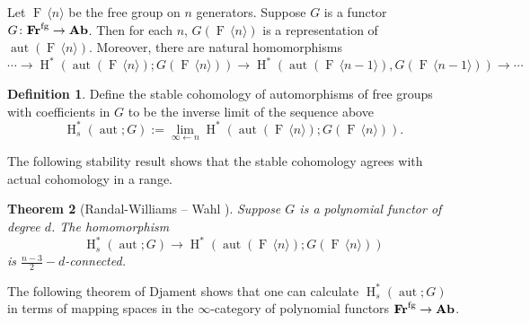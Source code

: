 \documentclass[psamsfonts]{amsart}
\theoremstyle{plain}
\newtheorem{thm}{Theorem}[section]
\theoremstyle{definition}
\newtheorem{defn}[thm]{Definition}
\theoremstyle{remark}
\newcommand{\catname}[1]{{\normalfont\textbf{#1}}}
\newcommand{\fr}{\allfr^{\mathrm{fg}}}
\newcommand{\allfr}{\catname{Fr}}
\newcommand{\ab}{\catname{Ab}}
\newcommand{\aut}{\operatorname{aut}}
\newcommand{\free}[1]{\operatorname{F}\,\langle #1\rangle}
\newcommand{\HH}{\operatorname{H}} %
\begin{document}
Let $\free{n}$ be the free group on $n$ generators. Suppose $G$ is a functor $G\colon \fr\to \ab$. Then for each $n$, $G(\free{n})$ is a representation of $\aut(\free{n})$. Moreover, there are natural homomorphisms
\[
 \cdots \to \HH^*(\aut(\free{n}); G(\free{n}))\to \HH^*(\aut(\free{n-1}), G(\free{n-1}))\to \cdots
\] 
\begin{defn}
Define the stable cohomology of automorphisms of free groups with coefficients in $G$ to be the inverse limit of the sequence above
\[\HH^*_s(\aut; G):=\lim_{\infty \leftarrow n}\HH^*(\aut(\free{n}); G(\free{n})).
\] 
\end{defn}
The following stability result shows that the stable cohomology agrees with actual cohomology in a range.
\begin{thm}[Randal-Williams -- Wahl \cite{RW-Wahl}]
Suppose $G$ is a polynomial functor of degree $d$. The homomorphism $$\HH^*_s(\aut; G)\to \HH^*(\aut(\free{n}); G(\free{n}))$$ is $\frac{n-3}{2}-d$-connected.
\end{thm} 
The following theorem of Djament shows that one can calculate $\HH^*_s(\aut; G)$ in terms of mapping spaces in the $\infty$-category of polynomial functors $\fr\to \ab$.
\end{document}
